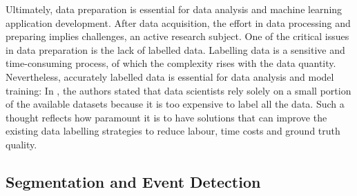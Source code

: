 
Ultimately, data preparation is essential for data analysis and machine learning application development. After data acquisition, the effort in data processing and preparing implies challenges, an active research subject. One of the critical issues in data preparation is the lack of labelled data. Labelling data is a sensitive and time-consuming process, of which the complexity rises with the data quantity. Nevertheless, accurately labelled data is essential for data analysis and model training: In \cite{roh2019survey}, the authors stated that data scientists rely solely on a small portion of the available datasets because it is too expensive to label all the data. Such a thought reflects how paramount it is to have solutions that can improve the existing data labelling strategies to reduce labour, time costs and ground truth quality.


\subsection{Segmentation and Event Detection}

